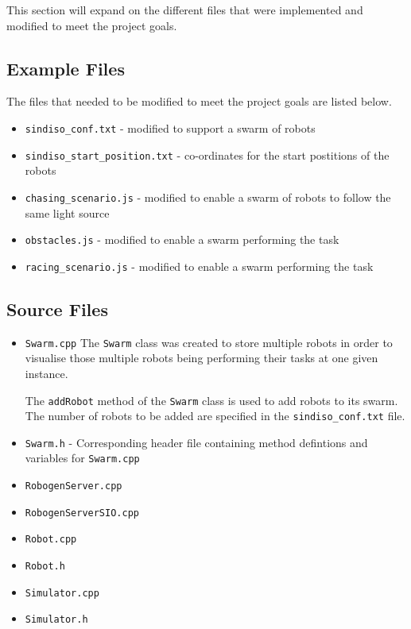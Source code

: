\documentclass[11pt,a4paper]{article}
\begin{document}
This section will expand on the different files that were implemented and
modified to meet the project goals.

\subsection{Example Files}

The files that needed to be modified to meet the project goals are listed below.

\begin{itemize}
    \item \texttt{sindiso\_conf.txt} - modified to support a swarm of robots
    \item \texttt{sindiso\_start\_position.txt} - co-ordinates for the start
        postitions of the robots
    \item \texttt{chasing\_scenario.js} - modified to enable a swarm of robots
        to follow the same light source
    \item \texttt{obstacles.js} - modified to enable a swarm performing the task
    \item \texttt{racing\_scenario.js} - modified to enable a swarm performing
        the task
\end{itemize}

\subsection{Source Files}
\begin{itemize}
    \item \texttt{Swarm.cpp} The \texttt{Swarm} class was created to store
        multiple robots in order to visualise those multiple robots being
        performing their tasks at one given instance.

        The \texttt{addRobot} method of the \texttt{Swarm} class is used to add
        robots to its swarm. The number of robots to be added are specified in
        the \texttt{sindiso\_conf.txt} file.
    \item \texttt{Swarm.h} - Corresponding header file containing method
        defintions and variables for \texttt{Swarm.cpp}
    \item \texttt{RobogenServer.cpp}
    \item \texttt{RobogenServerSIO.cpp}
    \item \texttt{Robot.cpp}
    \item \texttt{Robot.h}
    \item \texttt{Simulator.cpp}
    \item \texttt{Simulator.h}
\end{itemize}
\end{document}
